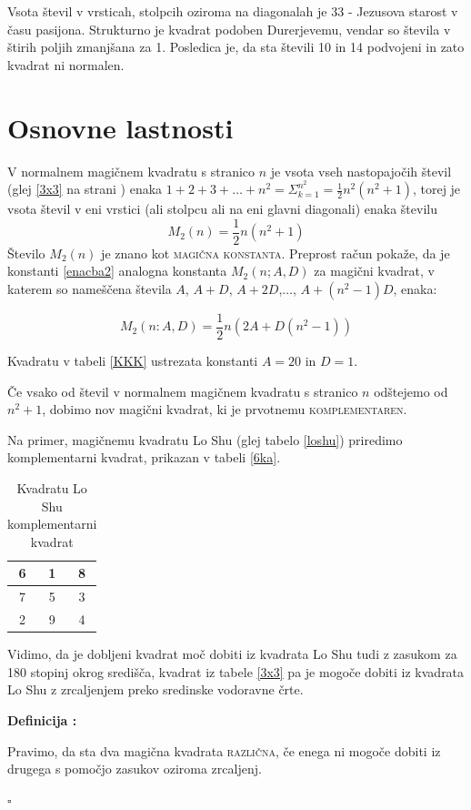 \documentclass[a4paper,12pt]{article}
\newcommand{\pojem}[1]{\textsc{#1}}
\newcounter{definicija} %
\newenvironment{definicija} 
{
	\stepcounter{definicija} %
	\begin{flushleft} %
	\textbf{Definicija \arabic{definicija}:} %
}
{
	\hfill $\square $ %
	\end{flushleft}
}
\begin{document}
Vsota števil v vrsticah, stolpcih oziroma na diagonalah je 33 - Jezusova starost
v času pasijona. Strukturno je kvadrat podoben Durerjevemu, vendar so števila
v štirih poljih zmanjšana za 1. Posledica je, da sta števili 10 in 14 podvojeni
in zato kvadrat ni normalen.

\section{Osnovne lastnosti}


V normalnem magičnem kvadratu s stranico $n$ je vsota vseh nastopajočih
števil (glej \ref{3x3} na strani \pageref{3x3}) enaka
$1+2+3+\ldots+n^2 = \Sigma_{k=1}^{n^2}=\frac{1}{2}n^2(n^2 + 1)$, torej je vsota
števil v eni vrstici (ali stolpcu ali na eni glavni diagonali) enaka številu
\begin{equation}
\label{enacba2}
M_2 (n)=\frac{1}{2}n(n^2 + 1) 
\end{equation}
Število $M_2 (n)$ je znano kot \pojem{magična konstanta}. Preprost račun
pokaže, da je konstanti \ref{enacba2} analogna konstanta $M_2 (n;A,D)$ za
magični kvadrat, v katerem so nameščena števila $A$, $A+D$, $A+2D$,$\ldots$,
$A+(n^2 - 1)D$, enaka:

$$M_2(n:A,D)=\frac{1}{2}n(2A+D(n^2 - 1)) $$

Kvadratu v tabeli \ref{KKK} ustrezata konstanti $A=20$ in $D=1$.

Če vsako od števil v normalnem magičnem kvadratu s stranico $n$ odštejemo
od $n^2 + 1$, dobimo nov magični kvadrat, ki je prvotnemu \pojem{komplementaren}.

Na primer, magičnemu kvadratu Lo Shu (glej tabelo \ref{loshu}) priredimo
komplementarni kvadrat, prikazan v tabeli \ref{6ka}.

\begin{table}[!h]
\centering
\caption{Kvadratu Lo Shu komplementarni kvadrat}
\vspace{2mm}
\label{komp}
\begin{tabular}{|c|c|c|}
\hline
6 & 1 & 8 \\ \hline
7 & 5 & 3 \\ \hline
2 & 9 & 4 \\ \hline

\end{tabular}
\end{table}

Vidimo, da je dobljeni kvadrat moč dobiti iz kvadrata Lo Shu tudi z zasukom za
180 stopinj okrog središča, kvadrat iz tabele \ref{3x3} pa je mogoče dobiti
iz kvadrata Lo Shu z zrcaljenjem preko sredinske vodoravne črte.
\begin{definicija}
   Pravimo, da sta dva magična kvadrata \pojem{različna}, če enega ni mogoče dobiti
   iz drugega s pomočjo zasukov oziroma zrcaljenj.
\end{definicija}
\end{document}

